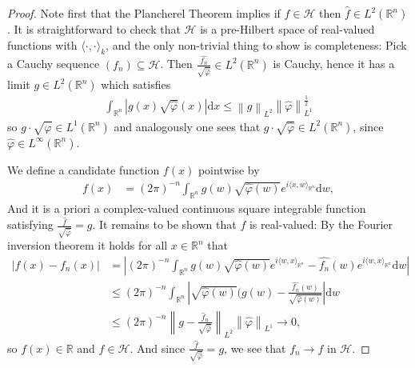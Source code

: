 \documentclass[10pt,twoside,openany,final]{memoir}
\theoremstyle{definition}
\theoremstyle{Break}
\newcommand{\lv}{\left\lVert}
\newcommand{\rv}{\right\rVert}
\newcommand{\R}{\mathbb{R}}
\renewcommand{\H}{\mathcal{H}}
\renewcommand{\d}{\mathrm{d}}
\begin{document}
\begin{proof}
	Note first that the Plancherel Theorem implies if $f \in \H$ then $\widehat f \in L^2(\R^n)$. It is straightforward to check that $\H$ is a pre-Hilbert space of real-valued functions with $\langle \cdot , \cdot \rangle_k$, and the only non-trivial thing to show is completeness: Pick a Cauchy sequence $(f_n)\subseteq \H$. Then $\frac{\widehat{f_n}}{\sqrt{\widehat{\varphi}}} \in L^2(\R^n)$ is Cauchy, hence it has a limit $g \in L^2(\R^n)$ which satisfies
	\begin{align*}
		\int_{\R^n} | g(x) \sqrt{\widehat{\varphi}}(x) | \d x \leq \lv g \rv_{L^2} \lv \widehat{\varphi} \rv_{L^1}^{\frac{1}{2}}	
	\end{align*}
	so $g \cdot \sqrt{\widehat{\varphi}} \in L^1(\R^n)$ and analogously one sees that $g \cdot \sqrt{\widehat{\varphi}} \in L^2(\R^n)$, since $\widehat \varphi \in L^\infty(\R^n)$. 
	
	We define a candidate function $f(x)$ pointwise by
	\begin{align*}
		f(x) &= (2\pi)^{-n}\int_{\R^n}g(w) \sqrt{\widehat \varphi(w)} e^{i\langle x, w \rangle_{\R^n}}\d w,
	\end{align*}
	And it is a priori a complex-valued continuous square integrable function satisfying $\frac{\widehat f}{\sqrt{\widehat \varphi}} = g$. It remains to be shown that $f$ is real-valued: By the Fourier inversion theorem it holds for all $x \in \R^n$ that
	\begin{align*}
		|f(x)-f_n(x)| &= \left| (2 \pi)^{-n} \int_{\R^n}g(w) \sqrt{\widehat \varphi(w)} e^{i \langle w,x \rangle_{\R^n}} - \widehat{f_n}(w) e^{i \langle w,x \rangle_{\R^n}} \d w\right|\\
		&\leq (2 \pi)^{-n} \int_{\R^n} \left| \sqrt{ \widehat \varphi(w)}( g(w) -\frac{\widehat{f_n}(w)}{\sqrt{\widehat \varphi(w)}} \right| \d w\\
		& \leq (2 \pi)^{-n} \lv g-\frac{\widehat f_n}{\sqrt{\widehat \varphi}} \rv_{L^2}\lv \widehat \varphi\rv_{L^1} \to 0,
	\end{align*}
	so $f(x) \in \R$ and $f \in \H$. And since $\frac{\widehat f}{\sqrt{\widehat \varphi}}=g$, we see that $f_n \to f$ in $\H$. 
	

\end{proof}
\end{document}
